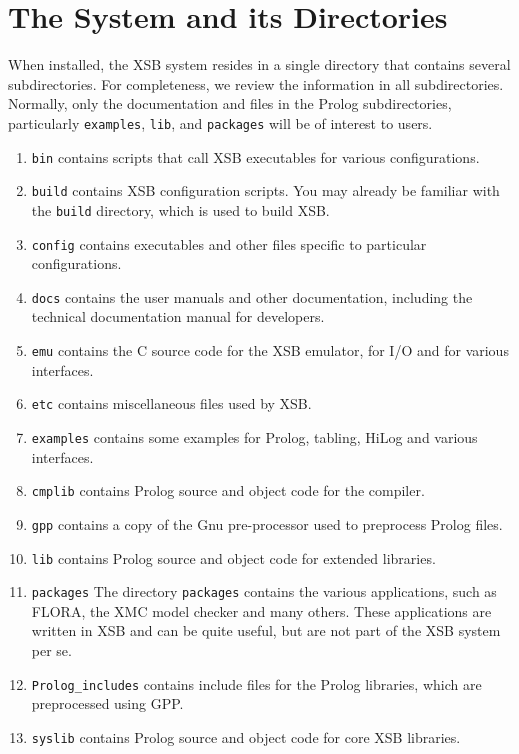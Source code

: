 \section{The System and its Directories}
When installed, the XSB system resides in a single directory that
contains several subdirectories.  For completeness, we review the
information in all subdirectories.  Normally, only the documentation
and files in the Prolog subdirectories, particularly {\tt examples},
{\tt lib}, and {\tt packages} will be of interest to users.
\begin{enumerate}
\item {\tt bin} contains scripts that call XSB executables
for various configurations.
%
\item {\tt build} contains XSB configuration scripts.  You may
already be familiar with the {\tt build} directory, which is used to
build XSB.
%
\item {\tt config} contains executables and other files specific to
particular configurations.
%
\item {\tt docs} contains the user manuals and other documentation,
including the technical documentation manual for developers.  
%
\item {\tt emu} contains the C source code for the XSB emulator, for
I/O and for various interfaces.
%
\item {\tt etc} contains miscellaneous files used by XSB.
%
\item {\tt examples} contains some examples for Prolog, tabling,
HiLog and various interfaces.
%
\item {\tt cmplib} contains Prolog source and object code for the
compiler. 
%
\item {\tt gpp} contains a copy of the Gnu pre-processor used to
preprocess Prolog files.
%
\item {\tt lib} contains Prolog source and object code for extended
libraries. 
%
\item {\tt packages} The directory {\tt packages} contains the various
applications, such as FLORA, the XMC model checker and many others.
These applications are written in XSB and can be quite useful, but are
not part of the XSB system per se.
%
\item {\tt Prolog\_includes} contains include files for the Prolog
libraries, which are preprocessed using GPP.
%
\item {\tt syslib} contains Prolog source and object code for core XSB
libraries. 
\end{enumerate}

